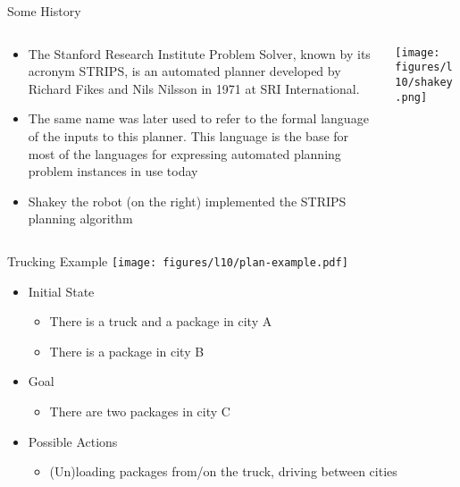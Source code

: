 \documentclass[t]{sdqbeamer}
\begin{document}
\begin{frame}{Some History}
\begin{columns}
\begin{column}{0.5\textwidth}
\begin{itemize}
\item The Stanford Research Institute Problem Solver, known by its acronym STRIPS, is an automated planner developed by Richard Fikes and Nils Nilsson in 1971 at SRI International.

\item The same name was later used to refer to the formal language of the inputs to this planner. This language is the base for most of the languages for expressing automated planning problem instances in use today

\item Shakey the robot (on the right) implemented the STRIPS planning algorithm
\end{itemize}
\end{column}
\begin{column}{0.5\textwidth}  %
    \begin{center}
\texttt{[image: figures/l10/shakey.png]}
     \end{center}
\end{column}

\end{columns}
\end{frame}

\begin{frame}{Trucking Example}
\texttt{[image: figures/l10/plan-example.pdf]}
\begin{itemize}
	\item Initial State
	\begin{itemize}
	\item There is a truck and a package in city A
	\item There is a package in city B
	\end{itemize}
	\item Goal
	\begin{itemize}
	\item There are two packages in city C
	\end{itemize}
	\item Possible Actions
	\begin{itemize}
	\item (Un)loading packages from/on the truck, driving between cities
	\end{itemize}
\end{itemize}
\end{frame}
\end{document}
